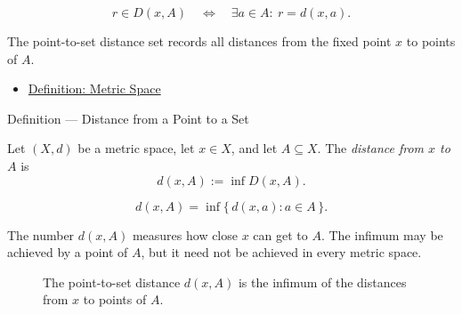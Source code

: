 \begin{remark*}
\[
r\in D(x,A)
\quad\Longleftrightarrow\quad
\exists a\in A{:}\ r=d(x,a).
\]
\end{remark*}

\begin{remark*}[Interpretation]
The point-to-set distance set records all distances from the fixed point
\(x\) to points of \(A\).
\end{remark*}


\begin{dependencies}
\begin{itemize}
  \item \hyperref[def:metric-space]{Definition: Metric Space}
\end{itemize}
\end{dependencies}

\begin{definitionbox}{Definition --- Distance from a Point to a Set}
\begin{definition}\label{def:metric-point-set-distance}
Let \((X,d)\) be a metric space, let \(x\in X\), and let \(A\subseteq X\).
The \emph{distance from \(x\) to \(A\)} is
\[
  d(x,A):=\inf D(x,A).
\]
\end{definition}
\end{definitionbox}

\begin{remark*}
\[
d(x,A)=\inf\{\,d(x,a):a\in A\,\}.
\]
\end{remark*}

\begin{remark*}[Interpretation]
The number \(d(x,A)\) measures how close \(x\) can get to \(A\).  The
infimum may be achieved by a point of \(A\), but it need not be achieved in
every metric space.
\end{remark*}

\begin{figure}[htbp]
\centering

\caption{The point-to-set distance \(d(x,A)\) is the infimum of the distances
from \(x\) to points of \(A\).}
\label{fig:metric-point-set-distance}
\end{figure}



